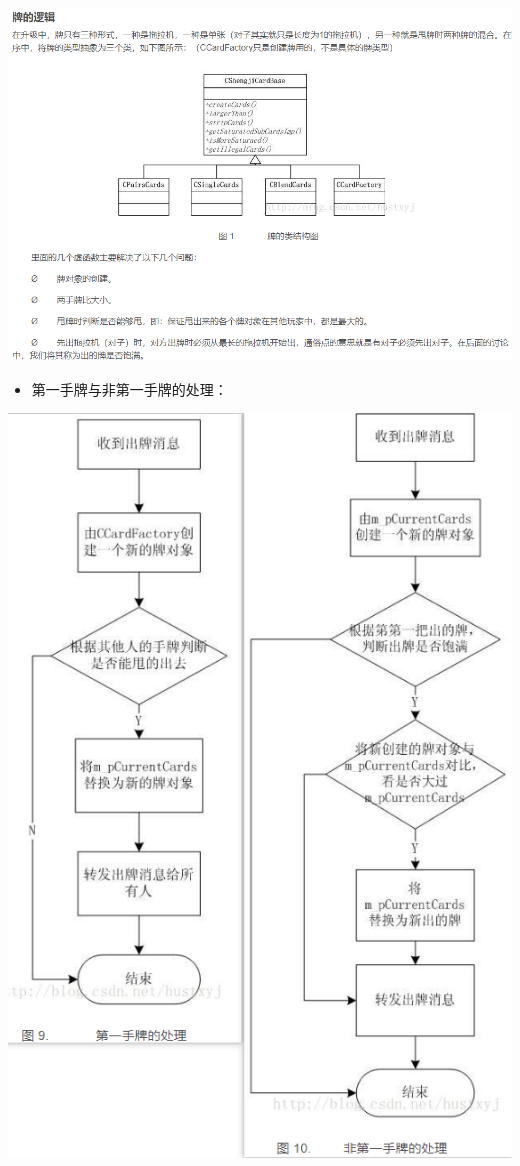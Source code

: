 \documentclass[9pt, b5paper]{article}
\begin{document}
\begin{center}
\includegraphics[width=.9\linewidth]{./pic/plan_20230508_213616.png}
\end{center}

\begin{itemize}
\item 第一手牌与非第一手牌的处理：
\end{itemize}

\begin{center}
\includegraphics[width=.9\linewidth]{./pic/plan_20230508_223827.png}
\end{center}
\end{document}
